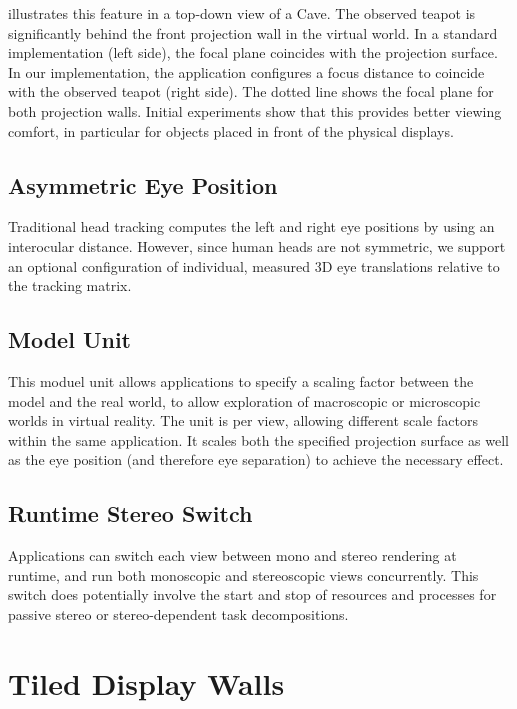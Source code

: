  illustrates this feature in a top-down view of a Cave. The
observed teapot is significantly behind the front projection wall in the
virtual world. In a standard implementation (left side), the focal plane
coincides with the projection surface. In our implementation, the application
configures a focus distance to coincide with the observed teapot (right side).
The dotted line shows the focal plane for both projection walls. Initial
experiments show that this provides better viewing comfort, in particular for
objects placed in front of the physical displays.

\subsection{Asymmetric Eye Position}

Traditional head tracking computes the left and right eye positions by using an
interocular distance. However, since human heads are not symmetric, we support
an optional configuration of individual, measured 3D eye translations relative
to the tracking matrix.

\subsection{Model Unit}

This moduel unit allows applications to specify a scaling factor between the
model and the real world, to allow exploration of macroscopic or microscopic
worlds in virtual reality. The unit is per view, allowing different scale
factors within the same application. It scales both the specified projection
surface as well as the eye position (and therefore eye separation) to achieve
the necessary effect.

\subsection{Runtime Stereo Switch}

Applications can switch each view between mono and stereo rendering at runtime,
and run both monoscopic and stereoscopic views concurrently. This switch does
potentially involve the start and stop of resources and processes for passive
stereo or stereo-dependent task decompositions.

\section{Tiled Display Walls}

